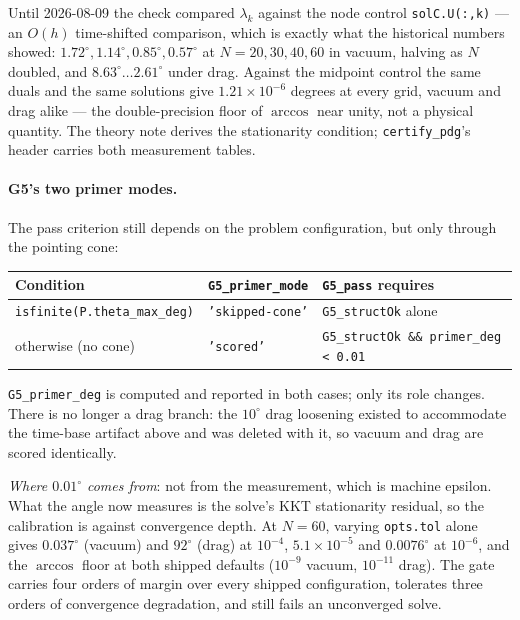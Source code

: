 \documentclass[11pt]{article}
\begin{document}
Until 2026-08-09 the check compared $\lambda_k$ against the node control
\texttt{solC.U(:,k)} --- an $O(h)$ time-shifted comparison, which is exactly
what the historical numbers showed: $1.72^\circ, 1.14^\circ, 0.85^\circ,
0.57^\circ$ at $N = 20,30,40,60$ in vacuum, halving as $N$ doubled, and
$8.63^\circ \ldots 2.61^\circ$ under drag. Against the midpoint control the
same duals and the same solutions give $1.21\times10^{-6}$ degrees at every
grid, vacuum and drag alike --- the double-precision floor of $\arccos$ near
unity, not a physical quantity. The theory note derives the stationarity
condition; \texttt{certify\_pdg}'s header carries both measurement tables.

\paragraph{G5's two primer modes.} The pass criterion still depends on the
problem configuration, but only through the pointing cone:

\begin{center}
\begin{tabular}{@{}lll@{}}
\toprule
Condition & \texttt{G5\_primer\_mode} & \texttt{G5\_pass} requires \\
\midrule
\texttt{isfinite(P.theta\_max\_deg)} & \texttt{'skipped-cone'} &
  \texttt{G5\_structOk} alone \\
otherwise (no cone) & \texttt{'scored'} &
  \texttt{G5\_structOk \&\& primer\_deg < 0.01} \\
\bottomrule
\end{tabular}
\end{center}

\texttt{G5\_primer\_deg} is computed and reported in both cases; only its
role changes. There is no longer a drag branch: the $10^\circ$ drag
loosening existed to accommodate the time-base artifact above and was
deleted with it, so vacuum and drag are scored identically.

\emph{Where $0.01^\circ$ comes from}: not from the measurement, which is
machine epsilon. What the angle now measures is the solve's KKT
stationarity residual, so the calibration is against convergence depth. At
$N=60$, varying \texttt{opts.tol} alone gives $0.037^\circ$ (vacuum) and
$92^\circ$ (drag) at $10^{-4}$, $5.1\times10^{-5}$ and $0.0076^\circ$ at
$10^{-6}$, and the $\arccos$ floor at both shipped defaults ($10^{-9}$
vacuum, $10^{-11}$ drag). The gate carries four orders of margin over every
shipped configuration, tolerates three orders of convergence degradation,
and still fails an unconverged solve.
\end{document}
